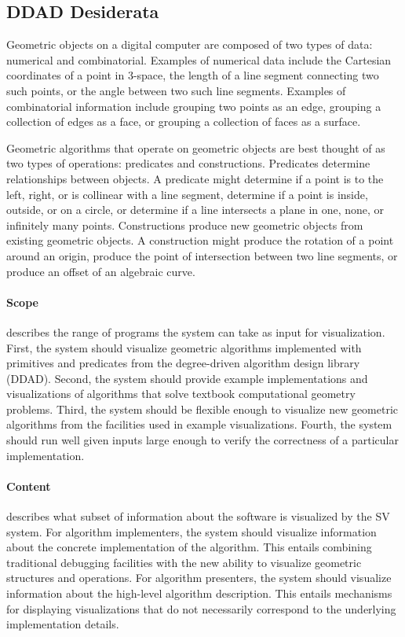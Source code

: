 \subsection{DDAD Desiderata}

Geometric objects on a digital computer are composed of two types of data:
numerical and combinatorial. Examples of numerical data include the
Cartesian coordinates of a point in 3-space, the length of a line segment
connecting two such points, or the angle between two such line segments.
Examples of combinatorial information include grouping two points as an
edge, grouping a collection of edges as a face, or grouping a collection of
faces as a surface.

Geometric algorithms that operate on geometric objects are best thought of as
two types of operations: predicates and constructions. Predicates determine
relationships between objects. A predicate might determine if a point is to
the left, right, or is collinear with a line segment, determine if a point is
inside, outside, or on a circle, or determine if a line intersects a plane in
one, none, or infinitely many points. Constructions produce new geometric
objects from existing geometric objects. A construction might produce the
rotation of a point around an origin, produce the point of intersection
between two line segments, or produce an offset of an algebraic curve.

\paragraph{Scope} describes the range of programs the system can take as input
for visualization. First, the system should visualize geometric algorithms
implemented with primitives and predicates from the degree-driven algorithm
design library (DDAD). Second, the system should provide example implementations
and visualizations of algorithms that solve textbook computational geometry
problems. Third, the system should be flexible enough to visualize new geometric
algorithms from the facilities used in example visualizations. Fourth, the
system should run well given inputs large enough to verify the correctness of a
particular implementation.

\paragraph{Content} describes what subset of information about the software is
visualized by the SV system. For algorithm implementers, the system should
visualize information about the concrete implementation of the algorithm. This
entails combining traditional debugging facilities with the new ability to
visualize geometric structures and operations. For algorithm presenters, the
system should visualize information about the high-level algorithm description.
This entails mechanisms for displaying visualizations that do not necessarily
correspond to the underlying implementation details.

